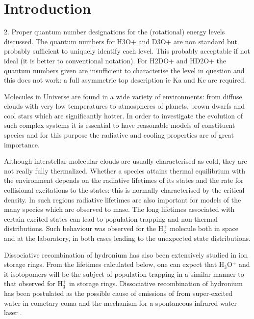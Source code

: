 \documentclass[prb,preprint,12pt,superscriptaddress,floatfix,bibnotes,nofootinbib,unsortedaddress,preprintnumbers,amsmath,amssymb]{revtex4}
\newcommand{\blue}[1]{{\color{blue} #1}}
\newcommand{\2}{$_{2}$}
\newcommand{\3}{$_{3}$}
\begin{document}
\section{Introduction}

\blue{
2. Proper quantum number designations for the (rotational) energy levels discussed. The
quantum numbers for H3O+ and D3O+ are non standard but probably sufficient to uniquely
identify each level. This probably acceptable if not ideal (it is better to conventional
notation). For H2DO+ and HD2O+ the quantum numbers given are insufficient to characterise
the level in question and this does not work: a full asymmetric top description ie Ka and Kc
are required.
}

Molecules in Universe are found in a wide variety of environments: from diffuse
clouds with very low temperatures to atmospheres of planets, brown dwarfs and
cool stars which are significantly hotter. In order to investigate the evolution
of such complex systems it is essential to have reasonable models of constituent
species and for this purpose the radiative and cooling properties are of great
importance.

Although interstellar molecular clouds are usually characterised as cold, they
are not really fully thermalized. Whether a species attains thermal equilibrium
with the environment depends on the radiative lifetimes of its states and the
rate for collisional excitations to the states: this is normally
characterised by the critical density. In such regions radiative
lifetimes are also important for models of the many species which are observed
to mase. The long lifetimes associated with certain excited states can lead to
population trapping and non-thermal distributions. Such behaviour was observed
for the H$^+_3$ molecule both in space\cite{02GoMcGe.H3+, 05OkGeGo.H3+} and at
the laboratory,\cite{02KrKrLa.H3+,04KrScTe.H3+} in both cases leading to the
unexpected state distributions.

Dissociative recombination of hydronium has also been extensively studied in ion storage rings.
\cite{96AnHeKe.H3O+,00NeKhRo.H3O+,00JeBiSa.H3O+,10BuStMe.H3O+,10NoBuSt.H3O+}
From the lifetimes calculated below, one can expect that H$_3$O$^{+}$ and it isotopomers
will be the subject of population trapping in a similar manner to that observed
for H$_3^+$ in storage rings. Dissociative recombination of hydronium
has been postulated as the possible cause of emissions of from super-excited
water in cometary coma \cite{jt452} and the mechanism for a spontaneous
infrared water laser \cite{01SaKeWa.H3O+}.
\end{document}
